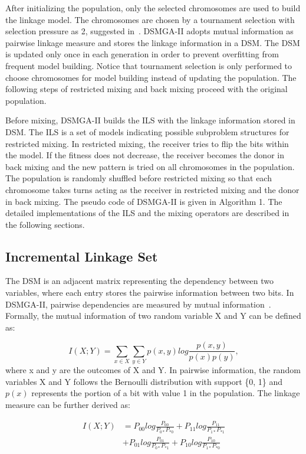 \documentclass{sig-alternate-05-2015}
\begin{document}
After initializing the population, only the selected chromosomes are used to build the linkage model. The chromosomes are chosen by a tournament selection with selection pressure as 2, suggested in~\cite{yu:population}. DSMGA-II adopts mutual information as pairwise linkage measure and stores the linkage information in a DSM. The DSM is updated only once in each generation in order to prevent overfitting from frequent model building. Notice that tournament selection is only performed to choose chromosomes for model building instead of updating the population. The following steps of restricted mixing and back mixing proceed with the original population.


Before mixing, DSMGA-II builds the ILS with the linkage information stored in DSM. The ILS is a set of models indicating possible subproblem structures for restricted mixing. In restricted mixing, the receiver tries to flip the bits within the model. If the fitness does not decrease, the receiver becomes the donor in back mixing and the new pattern is tried on all chromosomes in the population. The population is randomly shuffled before restricted mixing so that each chromosome takes turns acting as the receiver in restricted mixing and the donor in back mixing. The pseudo code of DSMGA-II is given in Algorithm 1. The detailed implementations of the ILS and the mixing operators are described in the following sections. 



\subsection{Incremental Linkage Set}
The DSM is an adjacent matrix representing the dependency between two variables, where each entry stores the pairwise information between two bits. In DSMGA-II, pairwise dependencies are measured by mutual information~\cite{kullback:KL-diversion}. Formally, the mutual information of two random variable X and Y can be defined as:

\begin{displaymath} 
I(X;Y) = \sum_{x \in X}\sum_{y \in Y} p(x,y)  log \frac{p(x,y)}{p(x) p(y)}, 
\end{displaymath}
where x and y are the outcomes of X and Y. In pairwise information, the random variables X and Y follows the Bernoulli distribution with support \{0, 1\} and $p(x)$ represents the portion of a bit with value 1 in the population. The linkage measure can be further derived as:

\begin{equation} 
\begin{split}
I(X;Y) &= P_{00 }log\frac{P_{00}}{P_{0*} P_{*0}} + P_{11 }log\frac{P_{11}}{P_{1*} P_{*1}}  \\
	    &+ P_{01 }log\frac{P_{01}}{P_{0*} P_{*1}} + P_{10 }log\frac{P_{10}}{P_{1*} P_{*0}}  
\end{split}
\end{equation}
\end{document}

